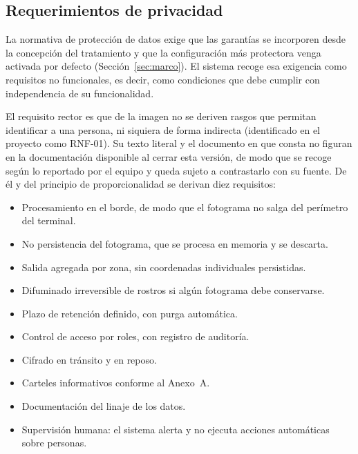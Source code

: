 \subsection{Requerimientos de privacidad}
\label{sec:privacidad-diseno}

La normativa de protección de datos exige que las garantías se incorporen
desde la concepción del tratamiento y que la configuración más protectora
venga activada por defecto (Sección~\ref{sec:marco}). El sistema recoge
esa exigencia como requisitos no funcionales, es decir, como condiciones
que debe cumplir con independencia de su funcionalidad.

El requisito rector es que de la imagen no se deriven rasgos que permitan
identificar a una persona, ni siquiera de forma indirecta (identificado en
el proyecto como RNF-01). Su texto literal y el documento en que consta no
figuran en la documentación disponible al cerrar esta versión, de modo que
se recoge según lo reportado por el equipo y queda sujeto a contrastarlo
con su fuente. De él y del principio de proporcionalidad
se derivan diez requisitos:

\begin{itemize}[leftmargin=3.6em,labelwidth=3em,labelsep=0.6em,align=left,itemsep=0.2em]
  \item[M-01] Procesamiento en el borde, de modo que el fotograma no salga
        del perímetro del terminal.
  \item[M-02] No persistencia del fotograma, que se procesa en memoria y
        se descarta.
  \item[M-03] Salida agregada por zona, sin coordenadas individuales
        persistidas.
  \item[M-04] Difuminado irreversible de rostros si algún fotograma debe
        conservarse.
  \item[M-05] Plazo de retención definido, con purga automática.
  \item[M-06] Control de acceso por roles, con registro de auditoría.
  \item[M-07] Cifrado en tránsito y en reposo.
  \item[M-08] Carteles informativos conforme al Anexo~A.
  \item[M-09] Documentación del linaje de los datos.
  \item[M-10] Supervisión humana: el sistema alerta y no ejecuta acciones
        automáticas sobre personas.
\end{itemize}

